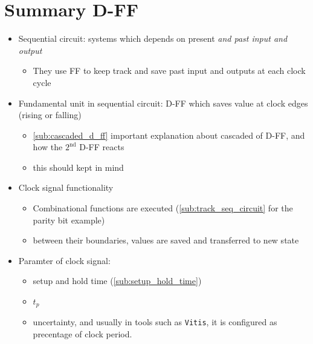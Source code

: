 \newpage
\section{Summary D-FF}

\begin{itemize}

\item Sequential circuit: systems which depends on present \textit{and past input and output}

	\begin{itemize}
	\item They use FF to keep track and save past input and outputs at each clock cycle
	\end{itemize}

\item Fundamental unit in sequential circuit: D-FF which saves value at clock edges (rising or falling)

	\begin{itemize}
	\item \ref{sub:cascaded_d_ff} important explanation about cascaded of D-FF, and how the $\mathrm{2}^\mathrm{nd}$ D-FF reacts
	
	\item this should kept in mind
	\end{itemize}

\item Clock signal functionality

	\begin{itemize}
	
	\item Combinational functions are executed (\ref{sub:track_seq_circuit} for the parity bit example)	
	
	\item between their boundaries, values are saved and transferred to new state
	
	\end{itemize}


\item Paramter of clock signal:

	\begin{itemize}

	\item setup and hold time (\ref{sub:setup_hold_time})

	\item $t_p$
	
	\item uncertainty, and usually in tools such as \verb|Vitis|, it is configured as precentage of clock period.
	\end{itemize}


\end{itemize}
